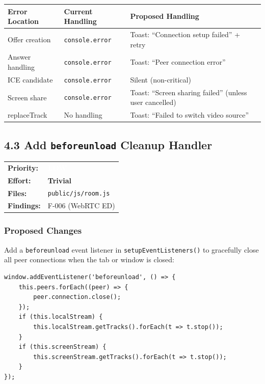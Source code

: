 \documentclass[11pt,letterpaper]{article}
\newcommand{\prilow}{\colorbox{notapplicable}{\textcolor{white}{\small\textbf{LOW}}}}
\newcommand{\efftrivial}{\colorbox{compliant!20}{\small\textbf{Trivial}}}
\begin{document}
\begin{center}
\begin{tabularx}{\textwidth}{L{4cm}L{4cm}L{5cm}}
\toprule
\textbf{Error Location} & \textbf{Current Handling} & \textbf{Proposed Handling} \\
\midrule
Offer creation & \texttt{console.error} & Toast: ``Connection setup failed'' + retry \\
Answer handling & \texttt{console.error} & Toast: ``Peer connection error'' \\
ICE candidate & \texttt{console.error} & Silent (non-critical) \\
Screen share & \texttt{console.error} & Toast: ``Screen sharing failed'' (unless user cancelled) \\
replaceTrack & No handling & Toast: ``Failed to switch video source'' \\
\bottomrule
\end{tabularx}
\end{center}

\subsection{4.3 Add \texttt{beforeunload} Cleanup Handler}

\begin{tabular}{ll}
\textbf{Priority:} & \prilow \\
\textbf{Effort:} & \efftrivial \\
\textbf{Files:} & \texttt{public/js/room.js} \\
\textbf{Findings:} & F-006 (WebRTC ED) \\
\end{tabular}

\subsubsection{Proposed Changes}

Add a \texttt{beforeunload} event listener in \texttt{setupEventListeners()} to gracefully close all peer connections when the tab or window is closed:

\begin{verbatim}
window.addEventListener('beforeunload', () => {
    this.peers.forEach((peer) => {
        peer.connection.close();
    });
    if (this.localStream) {
        this.localStream.getTracks().forEach(t => t.stop());
    }
    if (this.screenStream) {
        this.screenStream.getTracks().forEach(t => t.stop());
    }
});
\end{verbatim}
\end{document}
